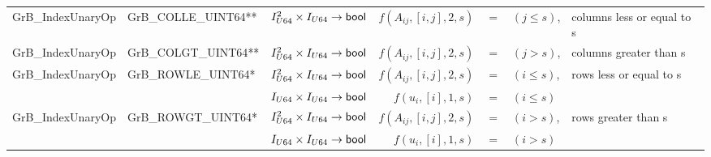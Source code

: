 \begin{landscape}
\begin{table}
\begin{threeparttable}
\begin{tabular}{l|l|l|rcll}
{\sf GrB\_IndexUnaryOp}   & {\sf GrB\_COLLE\_UINT64}**   & $I_{U64}^2 \times I_{U64} \rightarrow {\sf bool}$ & $f(A_{ij},[i,j],2,s)$ & $=$ & $(j \leq s)$, & columns less or equal to s \\
{\sf GrB\_IndexUnaryOp}   & {\sf GrB\_COLGT\_UINT64}**   & $I_{U64}^2 \times I_{U64} \rightarrow {\sf bool}$ & $f(A_{ij},[i,j],2,s)$ & $=$ & $(j > s)$, & columns greater than s \\
{\sf GrB\_IndexUnaryOp}   & {\sf GrB\_ROWLE\_UINT64}*  & $I_{U64}^2 \times I_{U64} \rightarrow {\sf bool}$ & $f(A_{ij},[i,j],2,s)$ & $=$ & $(i \leq s)$, & rows less or equal to s \\
                          &                            & $I_{U64} \times I_{U64} \rightarrow {\sf bool}$ & $f(u_{i},[i],1,s)$ & $=$ & $(i \leq s)$  \\
{\sf GrB\_IndexUnaryOp}   & {\sf GrB\_ROWGT\_UINT64}*  & $I_{U64}^2 \times I_{U64} \rightarrow {\sf bool}$ & $f(A_{ij},[i,j],2,s)$ & $=$ & $(i > s)$, & rows greater than s \\
                          &                            & $I_{U64} \times I_{U64} \rightarrow {\sf bool}$ & $f(u_{i},[i],1,s)$ & $=$ & $(i > s)$ \\
\hline
                     

\end{tabular}
\end{threeparttable}
\end{table}
\end{landscape}
